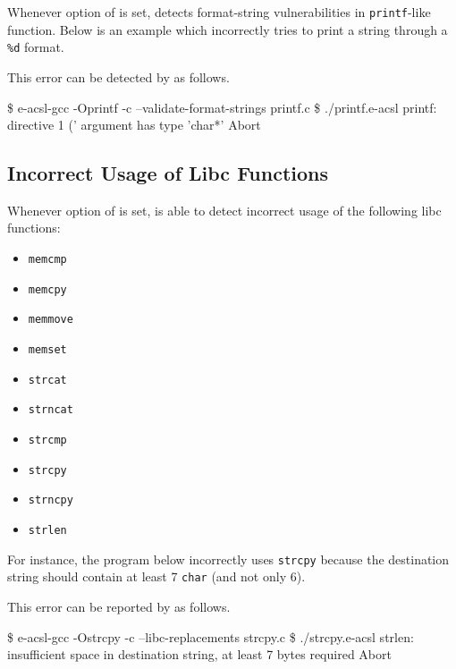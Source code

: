 Whenever option  of \eacslgcc is set, \eacsl
detects format-string vulnerabilities in \texttt{printf}-like function. Below is
an example which incorrectly tries to print a string through a \texttt{\%d}
format.


This error can be detected by \eacsl as follows.

\begin{logs}
\$ e-acsl-gcc -Oprintf -c --validate-format-strings printf.c
\$ ./printf.e-acsl
printf: directive 1 ('%
argument has type 'char*'
Abort
\end{logs}

\subsection{Incorrect Usage of Libc Functions}

Whenever option  of \eacslgcc is set, \eacsl is
able to detect incorrect usage of the following libc functions:
\begin{itemize}
  \item \texttt{memcmp}
  \item \texttt{memcpy}
  \item \texttt{memmove}
  \item \texttt{memset}
  \item \texttt{strcat}
  \item \texttt{strncat}
  \item \texttt{strcmp}
  \item \texttt{strcpy}
  \item \texttt{strncpy}
  \item \texttt{strlen}
\end{itemize}

For instance, the program below incorrectly uses \texttt{strcpy} because the
destination string should contain at least 7 \texttt{char} (and not only 6).


This error can be reported by \eacsl as follows.

\begin{logs}
\$ e-acsl-gcc -Ostrcpy -c --libc-replacements strcpy.c
\$ ./strcpy.e-acsl
strlen: insufficient space in destination string, at least 7 bytes required
Abort
\end{logs}

